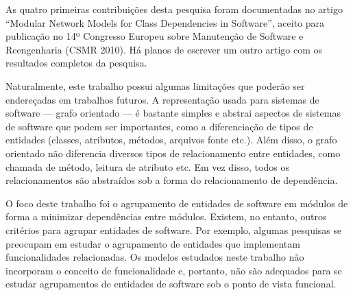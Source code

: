 As quatro primeiras contribuições desta pesquisa foram documentadas no artigo ``Modular Network Models for Class Dependencies in Software'', aceito para publicação no 14º Congresso Europeu sobre Manutenção de Software e Reengenharia (CSMR 2010). Há planos de escrever um outro artigo com os resultados completos da pesquisa.


Naturalmente, este trabalho possui algumas limitações que poderão ser endereçadas em trabalhos futuros. A representação usada para sistemas de software --- grafo orientado --- é bastante simples e abstrai aspectos de sistemas de software que podem ser importantes, como a diferenciação de tipos de entidades (classes, atributos, métodos, arquivos fonte etc.). Além disso, o grafo orientado não diferencia diversos tipos de relacionamento entre entidades, como chamada de método, leitura de atributo etc. Em vez disso, todos os relacionamentos são abstraídos sob a forma do relacionamento de dependência.

O foco deste trabalho foi o agrupamento de entidades de software em módulos de forma a minimizar dependências entre módulos. Existem, no entanto, outros critérios para agrupar entidades de software. Por exemplo, algumas pesquisas se preocupam em estudar o agrupamento de entidades que implementam funcionalidades relacionadas. Os modelos estudados neste trabalho não incorporam o conceito de funcionalidade e, portanto, não são adequados para se estudar agrupamentos de entidades de software sob o ponto de vista funcional.

% 
